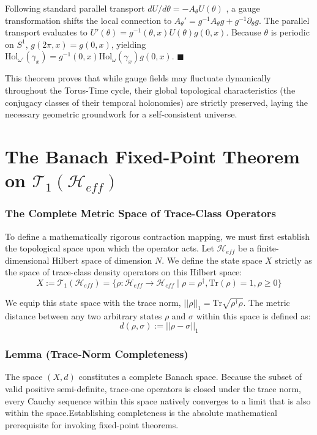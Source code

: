 \documentclass[12pt,openany]{book}
\theoremstyle{plain}
\theoremstyle{definition}
\theoremstyle{remark}
\begin{document}
 Following standard parallel transport $dU/d\theta = -A_\theta U(\theta)$ , a gauge transformation shifts the local connection to $A_\theta' = g^{-1}A_\theta g + g^{-1}\partial_\theta g$. The parallel transport evaluates to $U'(\theta) = g^{-1}(\theta, x)U(\theta)g(0, x)$. Because $\theta$ is periodic on $S^1$, $g(2\pi, x) = g(0, x)$, yielding $\text{Hol}_{\omega'}(\gamma_x) = g^{-1}(0, x)\text{Hol}_\omega(\gamma_x)g(0, x)$. $\blacksquare$
 
 This theorem proves that while gauge fields may fluctuate dynamically throughout the Torus-Time cycle, their global topological characteristics (the conjugacy classes of their temporal holonomies) are strictly preserved, laying the necessary geometric groundwork for a self-consistent universe.
 
 \chapter{The Banach Fixed-Point Theorem on $\mathcal{T}_1(\mathcal{H}_{eff})$}

\subsection{The Complete Metric Space of Trace-Class Operators} To define a mathematically rigorous contraction mapping, we must first establish the topological space upon which the operator acts. Let $\mathcal{H}_{eff}$ be a finite-dimensional Hilbert space of dimension $N$. We define the state space $X$ strictly as the space of trace-class density operators on this Hilbert space:
$$X := \mathcal{T}_1(\mathcal{H}_{eff}) = \{ \rho : \mathcal{H}_{eff} \to \mathcal{H}_{eff} \mid \rho = \rho^\dagger, \text{Tr}(\rho) = 1, \rho \ge 0 \}$$

We equip this state space with the trace norm, $||\rho||_1 = \text{Tr}\sqrt{\rho^\dagger \rho}$. The metric distance between any two arbitrary states $\rho$ and $\sigma$ within this space is defined as:
$$d(\rho, \sigma) := ||\rho - \sigma||_1$$

\subsection{Lemma (Trace-Norm Completeness)}  
The space $(X, d)$ constitutes a complete Banach space. Because the subset of valid positive semi-definite, trace-one operators is closed under the trace norm, every Cauchy sequence within this space natively converges to a limit that is also within the space.Establishing completeness is the absolute mathematical prerequisite for invoking fixed-point theorems.
\end{document}
